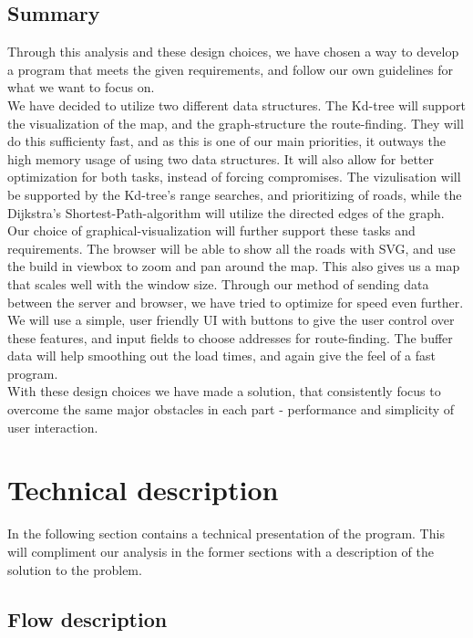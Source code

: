 \documentclass[a4paper,10pt,titlepage]{article}
\begin{document}
				
		\subsection{Summary}
Through this analysis and these design choices, we have chosen a way to develop a program that meets the given requirements, and follow our own guidelines for what we want to focus on.\\
We have decided to utilize two different data structures. The Kd-tree will support the visualization of the map, and the graph-structure the route-finding. They will do this sufficienty fast, and as this is one of our main priorities, it outways the high memory usage of using two data structures. It will also allow for better optimization for both tasks, instead of forcing compromises. The vizulisation will be supported by the Kd-tree's range searches, and prioritizing of roads, while the Dijkstra's Shortest-Path-algorithm will utilize the directed edges of the graph.\\
Our choice of graphical-visualization will further support these tasks and requirements. The browser will be able to show all the roads with SVG, and use the build in viewbox to zoom and pan around the map. This also gives us a map that scales well with the window size. Through our method of sending data between the server and browser, we have tried to optimize for speed even further.\\
We will use a simple, user friendly UI with buttons to give the user control over these features, and input fields to choose addresses for route-finding. The buffer data will help smoothing out the load times, and again give the feel of a fast program.\\
With these design choices we have made a solution, that consistently focus to overcome the same major obstacles in each part - performance and simplicity of user interaction.
			
	\newpage		
	\section{Technical description}
		In the following section contains a technical presentation of the program. This will compliment our analysis in the former sections with a description of the solution to the problem.
		
		\subsection{Flow description}
\end{document}
